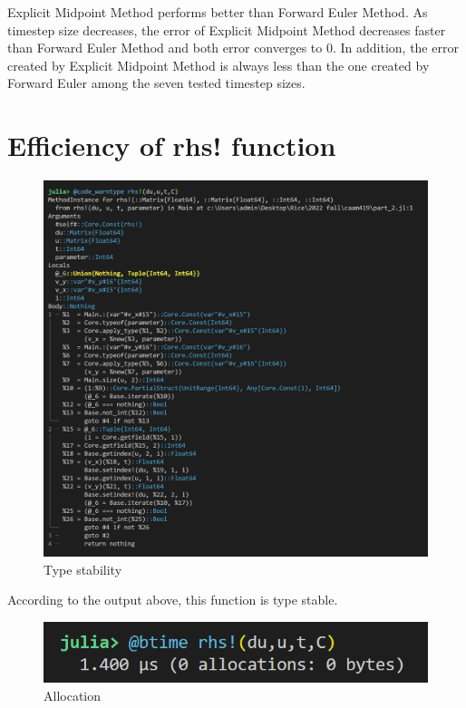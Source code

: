 \documentclass[10pt,a4paper]{article}
\begin{document}
Explicit Midpoint Method performs better than Forward Euler Method. As timestep size decreases, the error of Explicit Midpoint Method decreases faster than Forward Euler Method and both error converges to 0. In addition, the error created by Explicit Midpoint Method is always less than the one created by Forward Euler among the seven tested timestep sizes. 


\section{Efficiency of rhs! function}

\begin{figure}[!ht]
        \centering \includegraphics[scale=0.5]{figures/stability.png}
        \caption{Type stability}
\end{figure}

\noindent According to the output above, this function is type stable.

\begin{figure}[!ht]
        \centering \includegraphics[scale=1]{figures/btime.png}
        \caption{Allocation}
\end{figure}
\end{document}
